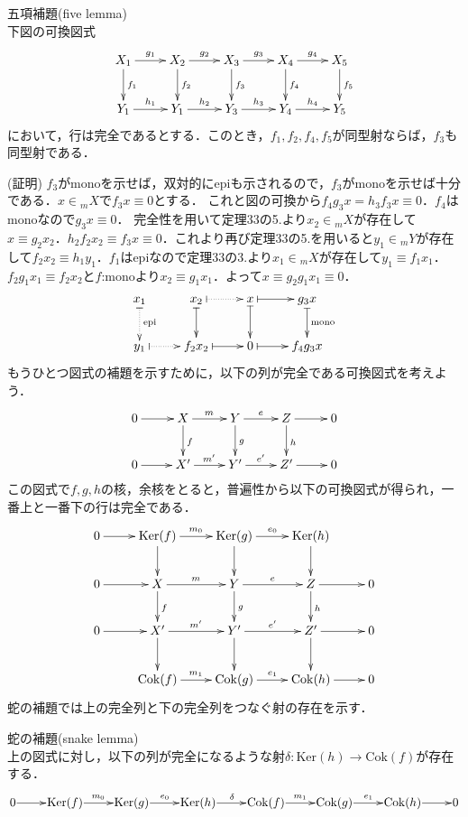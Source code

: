 \begin{lem}五項補題(five lemma)\\
下図の可換図式
\[
\xymatrix{
X_1 \ar[d]^{f_1} \ar[r]^{g_1} & X_2 \ar[d]^{f_2} \ar[r]^{g_2} & X_3 \ar[d]^{f_3} \ar[r]^{g_3} & X_4 \ar[d]^{f_4} \ar[r]^{g_4} &
X_5 \ar[d]^{f_5}  \\
Y_1 \ar[r]^{h_1} & Y_1 \ar[r]^{h_2} & Y_3 \ar[r]^{h_3} & Y_4 \ar[r]^{h_4} & Y_5 
}
\]
において，行は完全であるとする．このとき，$f_1,f_2,f_4,f_5$が同型射ならば，$f_3$も同型射である．
\end{lem}
(証明)
$f_3$がmonoを示せば，双対的にepiも示されるので，$f_3$がmonoを示せば十分である．$x \in {}_mX$で$f_3x \equiv 0$とする．
これと図の可換から$f_4g_3x = h_3f_3x \equiv 0$．$f_4$はmonoなので$g_3x \equiv 0$．
完全性を用いて定理33の5.より$x_2 \in {}_mX$が存在して$x \equiv g_2x_2$．$h_2f_2x_2 \equiv f_3x \equiv 0 $．これより再び定理33の5.を用いると$y_1 \in {}_mY$が存在して$f_2x_2 \equiv h_1y_1$．$f_1$はepiなので定理33の3.より$x_1\in {}_mX$が存在して$y_1 \equiv f_1x_1$．
$f_2g_1x_1 \equiv f_2x_2$と$f$:monoより$x_2 \equiv g_1x_1$．よって$x \equiv g_2g_1x_1 \equiv 0$．
\[
\xymatrix{
x_1\ar@{|.>}^{\mathrm{epi}}[d] & x_2 \ar@{|.>}[r] \ar@{|->}[d]&x \ar@{|->}[d] \ar@{|->}[r]& g_3x \ar@{|->}^{\mathrm{mono}}[d] \\
y_1 \ar@{|.>}[r]& f_2x_2 \ar@{|->}[r]& 0\ar@{|->}[r] & f_4g_3x
}
\]
\proofend
もうひとつ図式の補題を示すために，以下の列が完全である可換図式を考えよう．
\[
\xymatrix{
0 \ar[r] & X \ar[d]^f \ar[r]^m & Y \ar[d]^g \ar[r]^e & Z \ar[d]^h \ar[r] & 0 \\
0 \ar[r] & X' \ar[r]^{m'} &Y' \ar[r]^{e'} & Z' \ar[r] & 0 
}
\]
この図式で$f,g,h$の核，余核をとると，普遍性から以下の可換図式が得られ，一番上と一番下の行は完全である．
\[
\xymatrix{
0 \ar[r] & \mathrm{Ker}(f) \ar[d] \ar[r]^{m_0} &\mathrm{Ker}(g) \ar[d] \ar[r]^{e_0} & \mathrm{Ker}(h) \ar[d]   \\
0 \ar[r] & X \ar[d]^f \ar[r]^m & Y \ar[d]^g \ar[r]^e & Z \ar[d]^h \ar[r] & 0 \\
0 \ar[r] & X' \ar[d] \ar[r]^{m'} &Y' \ar[d] \ar[r]^{e'} & Z' \ar[d] \ar[r] & 0 \\
& \mathrm{Cok}(f) \ar[r]^{m_1} &\mathrm{Cok}(g) \ar[r]^{e_1} & \mathrm{Cok}(h) \ar[r] & 0  \\
}
\]
蛇の補題では上の完全列と下の完全列をつなぐ射の存在を示す．
\begin{lem}蛇の補題(snake lemma)\\
上の図式に対し，以下の列が完全になるような射$\delta:\mathrm{Ker}(h) \to \mathrm{Cok}(f)$が存在する．
\[
\xymatrix@1{
0 \ar[r] & \mathrm{Ker}(f)  \ar[r]^{m_0} &\mathrm{Ker}(g) \ar[r]^{e_0} & \mathrm{Ker}(h) \ar[r]^{\delta}
 & \mathrm{Cok}(f) \ar[r]^{m_1} &\mathrm{Cok}(g) \ar[r]^{e_1} & \mathrm{Cok}(h) \ar[r] & 0
}
\]
\end{lem}

